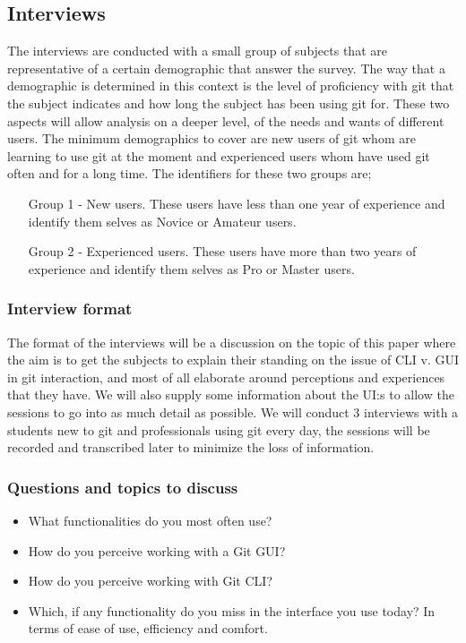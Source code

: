 \documentclass[a4paper,oneside]{bth} %
\begin{document}
				\subsection{Interviews}
				The interviews are conducted with a small group of subjects that are representative of a certain demographic that answer the survey. The way that a demographic is determined in this context is the level of proficiency with git that the subject indicates and how long the subject has been using git for. 
				These two aspects will allow analysis on a deeper level, of the needs and wants of different users. The minimum demographics to cover are new users of git whom are learning to use git at the moment and experienced users whom have used git often and for a long time. The identifiers for these two groups are;
				\begin{itemize}
					\item[Group 1 - New users.]
					These users have less than one year of experience and identify them selves as Novice or Amateur users.
					\item[Group 2 - Experienced users.]
					These users have more than two years of experience and identify them selves as Pro or Master users.
				\end{itemize}
					\subsubsection*{Interview format}
					The format of the interviews will be a discussion on the topic of this paper where the aim is to get the subjects to explain their standing on the issue of CLI v. GUI in git interaction, and most of all elaborate around perceptions and experiences that they have. We will also supply some information about the UI:s to allow the sessions to go into as much detail as possible. 
					We will conduct 3 interviews with a students new to git and professionals using git every day, the sessions will be recorded and transcribed later to minimize the loss of information.
					
					\subsubsection*{Questions and topics to discuss}
						\begin{itemize}
							\item What functionalities do you most often use?
							\item How do you perceive working with a Git GUI?
							\item How do you perceive working with Git CLI?
							\item Which, if any functionality do you miss in the interface you use today? In terms of ease of use, efficiency and comfort.
						\end{itemize}
						
\end{document}
